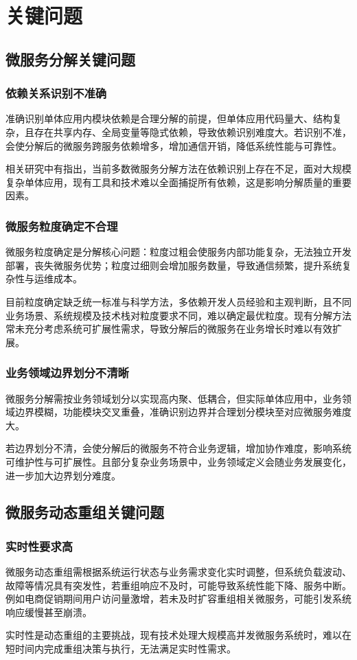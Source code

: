 \documentclass[lang=cn,11pt,a4paper,cite=number]{elegantpaper}
\begin{document}
\section{关键问题}
\subsection{微服务分解关键问题}
\subsubsection{依赖关系识别不准确}
\label{sec:x1}
准确识别单体应用内模块依赖是合理分解的前提，但单体应用代码量大、结构复杂，且存在共享内存、全局变量等隐式依赖，导致依赖识别难度大。若识别不准，会使分解后的微服务跨服务依赖增多，增加通信开销，降低系统性能与可靠性。\par
相关研究中有指出，当前多数微服务分解方法在依赖识别上存在不足，面对大规模复杂单体应用，现有工具和技术难以全面捕捉所有依赖，这是影响分解质量的重要因素。\cite{tsse2023decomposition}
\subsubsection{微服务粒度确定不合理}
\label{sec:x1}
微服务粒度确定是分解核心问题：粒度过粗会使服务内部功能复杂，无法独立开发部署，丧失微服务优势；粒度过细则会增加服务数量，导致通信频繁，提升系统复杂性与运维成本。\par
目前粒度确定缺乏统一标准与科学方法，多依赖开发人员经验和主观判断，且不同业务场景、系统规模及技术栈对粒度要求不同，难以确定最优粒度。现有分解方法常未充分考虑系统可扩展性需求，导致分解后的微服务在业务增长时难以有效扩展。\cite{icse2023actor}
\subsubsection{业务领域边界划分不清晰}
\label{sec:x1}
微服务分解需按业务领域划分以实现高内聚、低耦合，但实际单体应用中，业务领域边界模糊，功能模块交叉重叠，准确识别边界并合理划分模块至对应微服务难度大。\par
若边界划分不清，会使分解后的微服务不符合业务逻辑，增加协作难度，影响系统可维护性与可扩展性。且部分复杂业务场景中，业务领域定义会随业务发展变化，进一步加大边界划分难度。

\subsection{微服务动态重组关键问题}
\subsubsection{实时性要求高}
\label{sec:x1}
微服务动态重组需根据系统运行状态与业务需求变化实时调整，但系统负载波动、故障等情况具有突发性，若重组响应不及时，可能导致系统性能下降、服务中断。例如电商促销期间用户访问量激增，若未及时扩容重组相关微服务，可能引发系统响应缓慢甚至崩溃。\par
实时性是动态重组的主要挑战，现有技术处理大规模高并发微服务系统时，难以在短时间内完成重组决策与执行，无法满足实时性需求。\cite{acmsurvey2024dynamic}
\end{document}
